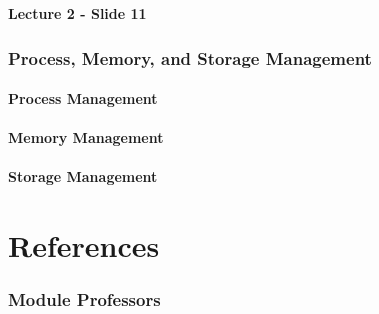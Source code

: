 \documentclass{article}
\newcommand{\separate}[1] {\vspace{#1 pt}\noindent}
\begin{document}
\separate{10}\textbf{Lecture 2 - Slide 11}

\section{Process, Memory, and Storage Management}

\subsection{Process Management}

\subsection{Memory Management}

\subsection{Storage Management}

\newpage\part{References}

\section{Module Professors}
\end{document}
